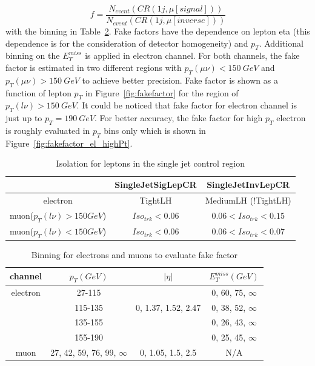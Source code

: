 \begin{equation}
 f = \frac{N_{event}(CR(1j, \mu\left[signal\right]))}{N_{event}(CR(1j, \mu\left[inverse\right]))}
\end{equation}
with the binning in Table~\ref{tab:FFBinning}. Fake factors have the dependence on lepton eta (this dependence is for the consideration of detector homogeneity) and $p_{T}$. Additional binning on the $E_{T}^{miss}$ is applied in electron channel. For both channels, the fake factor is estimated in two different regions with $p_{T}(\mu\nu)<150~GeV$ and $p_{T}(\mu\nu)>150~GeV$ to achieve better precision. Fake factor is shown as a function of lepton $p_{T}$ in Figure~\ref{fig:fakefactor} for the region of $p_{T}(l\nu)>150~GeV$. It could be noticed that fake factor for electron channel is just up to $p_{T}=190~GeV$. For better accuracy, the fake factor for high $p_{T}$ electron is roughly evaluated in $p_{T}$ bins only which is shown in Figure~\ref{fig:fakefactor_el_highPt}.

\begin{table}[h]
  \caption{Isolation for leptons in the single jet control region} \label{tab:LepIsoCR}
  \begin{center}

    \begin{tabular}{ | c | c | c | }
     \hline
                               &   SingleJetSigLepCR   & SingleJetInvLepCR \\ \hline
    electron                   &        TightLH        & MediumLH (!TightLH) \\ \hline
    muon($p_{T}(l\nu)>150 GeV$) &  $Iso_{trk}<0.06$    & $0.06<Iso_{trk}<0.15$ \\ \hline
    muon($p_{T}(l\nu)<150 GeV$) &  $Iso_{trk}<0.06$    & $0.06<Iso_{trk}<0.07$ \\ \hline
\end{tabular}
\end{center}
\end{table}


\begin{table}[h]
  \caption{Binning for electrons and muons to evaluate fake factor} \label{tab:FFBinning}
\begin{center}

\begin{tabular}{ | c | c | c | c |}
    \hline
    channel  & $p_{T}(GeV)$ & $|\eta|$ & $E_{T}^{miss}(GeV)$ \\ \hline
    electron & 27-115 &  & 0, 60, 75, $\infty$ \\
             & 115-135&0, 1.37, 1.52, 2.47 & 0, 38, 52, $\infty$ \\
             & 135-155& & 0, 26, 43, $\infty$ \\
             & 155-190& & 0, 25, 45, $\infty$ \\ \hline
    muon     & 27, 42, 59, 76, 99, $\infty$ & 0, 1.05, 1.5, 2.5 & N/A \\ \hline

\end{tabular}
\end{center}
\end{table}

